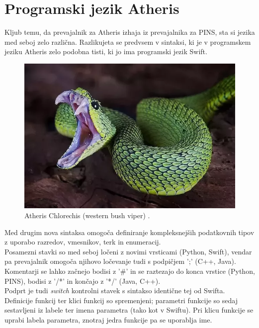 \documentclass[a4paper, 12p]{book}
\begin{document}
\chapter{Programski jezik Atheris}
\label{ch1}

Kljub temu, da prevajalnik za Atheris izhaja iz prevajalnika za PINS, sta si jezika med seboj zelo različna. Razlikujeta se predvsem v sintaksi, ki je v programskem jeziku Atheris zelo podobna tisti, ki jo ima programski jezik Swift. \\
\begin{figure}[h]
	\begin{center}
		\includegraphics[width=1\textwidth]{resources/atheris.png}
	\end{center}
	\caption{Atheris Chlorechis (western bush viper) \cite{Atheris}.}
	\label{image:ast}
\end{figure}

\indent Med drugim nova sintaksa omogoča definiranje kompleksnejših podatkovnih tipov z uporabo razredov, vmesnikov, terk in enumeracij. \\
\indent Posamezni stavki so med seboj ločeni z novimi vrsticami (Python, Swift), vendar pa prevajalnik omogoča njihovo ločevanje tudi s podpičjem ';' (C++, Java). \\
\indent Komentarji se lahko začnejo bodisi z '\#' in se raztezajo do konca vrstice (Python, PINS), bodisi z '/*' in končajo z '*/' (Java, C++). \\
\indent Podprt je tudi \textit{switch} kontrolni stavek s sintakso identične tej od Swifta.\\
\indent Definicije funkcij ter klici funkcij so spremenjeni; parametri funkcije so sedaj sestavljeni iz labele ter imena parametra (tako kot v Swiftu). Pri klicu funkcije se uprabi labela parametra, znotraj jedra funkcije pa se uporablja ime.
\end{document}
